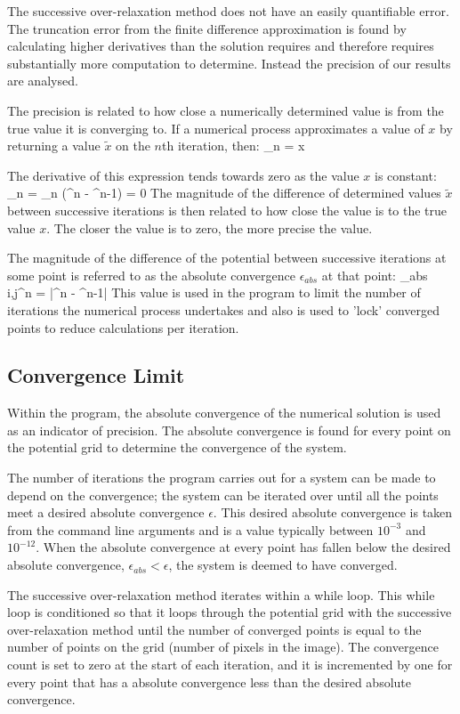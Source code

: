 The successive over-relaxation method does not have an easily quantifiable error. The truncation error from the finite difference approximation is found by calculating higher derivatives than the solution requires and therefore requires substantially more computation to determine. Instead the precision of our results are analysed.

The precision is related to how close a numerically determined value is from the true value it is converging to. If a numerical process approximates a value of $x$ by returning a value $\tilde{x}$ on the $n$th iteration, then:
\be
\lim_{n \rightarrow \infty} = x                     
\ee

The derivative of this expression tends towards zero as the value $x$ is constant:
\be
\lim_{n \rightarrow \infty} = \lim_{n \rightarrow \infty} (^{n} - ^{n-1}) = 0                     
\ee
The magnitude of the difference of determined values $\tilde{x}$ between successive iterations is then related to how close the value is to the true value $x$. The closer the value is to zero, the more precise the value.

The magnitude of the difference of the potential between successive iterations at some point is referred to as the absolute convergence $\epsilon_{abs}$ at that point:
\be
\epsilon_{abs \; i,j}^{n} = |\tilde{\phi}^{n} - \tilde{\phi}^{n-1}|
\ee
This value is used in the program to limit the number of iterations the numerical process undertakes and also is used to 'lock' converged points to reduce calculations per iteration.
\subsection{Convergence Limit}
Within the program, the absolute convergence of the numerical solution is used as an indicator of precision. The absolute convergence is found for every point on the potential grid to determine the convergence of the system.

The number of iterations the program carries out for a system can be made to depend on the convergence; the system can be iterated over until all the points meet a desired absolute convergence $\epsilon$. This desired absolute convergence is taken from the command line arguments and is a value typically between $10^{-3}$ and $10^{-12}$. When the absolute convergence at every point has fallen below the desired absolute convergence, $\epsilon_{abs} < \epsilon$, the system is deemed to have converged. 

The successive over-relaxation method iterates within a while loop. This while loop is conditioned so that it loops through the potential grid with the successive over-relaxation method until the number of converged points is equal to the number of points on the grid (number of pixels in the image). The convergence count is set to zero at the start of each iteration, and it is incremented by one for every point that has a absolute convergence less than the desired absolute convergence.
